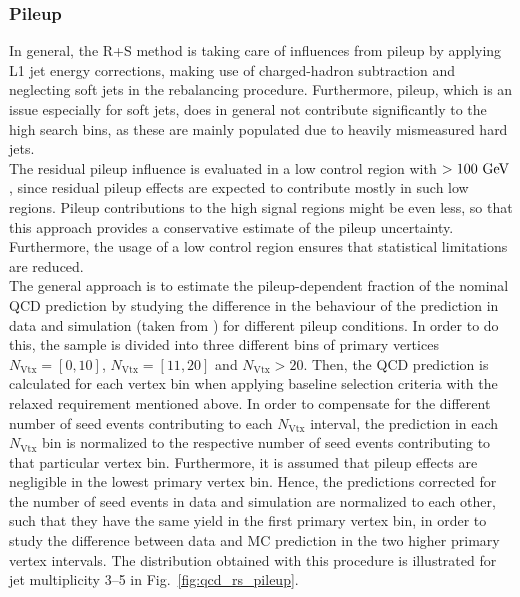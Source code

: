 \subsubsection*{Pileup} 
In general, the R+S method is taking care of influences from pileup by applying L1 jet energy corrections, making use of charged-hadron subtraction and neglecting soft jets in the rebalancing procedure. Furthermore, pileup, which is an issue especially for soft jets, does in general not contribute significantly to the high \MHT search bins, as these are mainly populated due to heavily mismeasured hard jets. \\
The residual pileup influence is evaluated in a low \MHT control region with \MHT $> 100 \rm{~GeV}$, since residual pileup effects are expected to contribute mostly in such low \MHT regions. Pileup contributions to the high \MHT signal regions might be even less, so that this approach provides a conservative estimate of the pileup uncertainty. Furthermore, the usage of a low \MHT control region ensures that statistical limitations are reduced.\\
The general approach is to estimate the pileup-dependent fraction of the nominal QCD prediction by studying the difference in the behaviour of the prediction in data and simulation (taken from \madgraph) for different pileup conditions. In order to do this, the sample is divided into three different bins of primary vertices $N_\mathrm{Vtx} = [0, 10]$, $N_\mathrm{Vtx} = [11, 20]$ and $N_\mathrm{Vtx} > 20$. Then, the QCD prediction is calculated for each vertex bin when applying baseline selection criteria with the relaxed \MHT requirement mentioned above. In order to compensate for the different number of seed events contributing to each $N_\mathrm{Vtx}$ interval, the prediction in each $N_\mathrm{Vtx}$ bin is normalized to the respective number of seed events contributing to that particular vertex bin. Furthermore, it is assumed that pileup effects are negligible in the lowest primary vertex bin. Hence, the predictions corrected for the number of seed events in data and simulation are normalized to each other, such that they have the same yield in the first primary vertex bin, in order to study the difference between data and MC prediction in the two higher primary vertex intervals. The distribution obtained with this procedure is illustrated for jet multiplicity 3--5 in Fig.~\ref{fig:qcd_rs_pileup}. 
